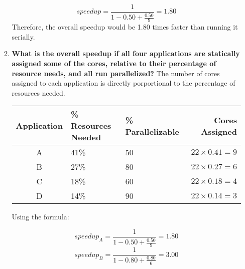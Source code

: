 \begin{enumerate}
\begin{enumerate}
\begin{equation*}
                        speedup = \frac{1}{1-0.50 + \frac{0.50}{9}} = 1.80
                    \end{equation*}
                    Therefore, the overall speedup would be 1.80 times faster than running it serially.
              \item \textbf{What is the overall speedup if all four applications are statically assigned some of the cores, relative to their percentage of resource needs, and all run parallelized?}
                    The number of cores assigned to each application is directly porportional to the percentage of resources needed.
                    \begin{table}[H]
                        \centering
                        \begin{tabular}{@{}cllr@{}}
                            \toprule
                            Application & \% Resources Needed & \% Parallelizable & Cores Assigned       \\
                            \midrule
                            A           & 41\%                & 50                & $22 \times 0.41 = 9$ \\
                            B           & 27\%                & 80                & $22 \times 0.27 = 6$ \\
                            C           & 18\%                & 60                & $22 \times 0.18 = 4$ \\
                            D           & 14\%                & 90                & $22 \times 0.14 = 3$ \\
                            \bottomrule
                        \end{tabular}
                    \end{table}
                    Using the formula: \\
                    \begin{minipage}{-0.2\textwidth}
                        \begin{equation*}
                            speedup_{A} = \frac{1}{1-0.50 + \frac{0.50}{9}} = 1.80
                        \end{equation*}
                        \begin{equation*}
                            speedup_{B} = \frac{1}{1-0.80 + \frac{0.80}{6}} = 3.00
                        \end{equation*}
                    \end{minipage}

\end{enumerate}
\end{enumerate}
